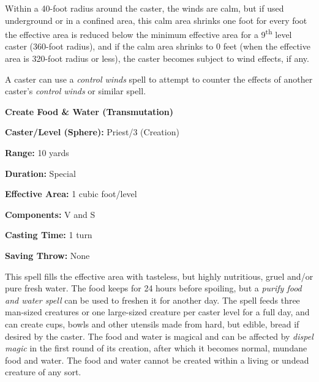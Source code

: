 \begin{multicols}{2}
Within a 40-foot radius around the caster, the winds are calm, but if used underground or in a confined area, this calm area shrinks one foot for every foot the effective area is reduced below the minimum effective area for a 9\textsuperscript{th} level caster (360-foot radius), and if the calm area shrinks to 0 feet (when the effective area is 320-foot radius or less), the caster becomes subject to wind effects, if any.
 
A caster can use a \textit{control winds} spell to attempt to counter the effects of another caster's \textit{control winds} or similar spell.

\vspace{1em}

\noindent
\begin{minipage}{\columnwidth}

\noindent \textbf{Create Food \& Water (Transmutation)}

\noindent \textbf{Caster/Level (Sphere):} Priest/3 (Creation)

\noindent \textbf{Range:} 10 yards

\noindent \textbf{Duration:} Special

\noindent \textbf{Effective Area:} 1 cubic foot/level

\noindent \textbf{Components:} V and S

\noindent \textbf{Casting Time:} 1 turn

\noindent \textbf{Saving Throw:} None

\end{minipage}

This spell fills the effective area with tasteless, but highly nutritious, gruel and/or pure fresh water.  The food keeps for 24 hours before spoiling, but a \textit{purify food and water spell} can be used to freshen it for another day.  The spell feeds three man-sized creatures or one large-sized creature per caster level for a full day, and can create cups, bowls and other utensils made from hard, but edible, bread if desired by the caster.  The food and water is magical and can be affected by \textit{dispel magic} in the first round of its creation, after which it becomes normal, mundane food and water.  The food and water cannot be created within a living or undead creature of any sort.

\vspace{1em}

\noindent
\begin{minipage}{\columnwidth}


\end{minipage}
\end{multicols}
